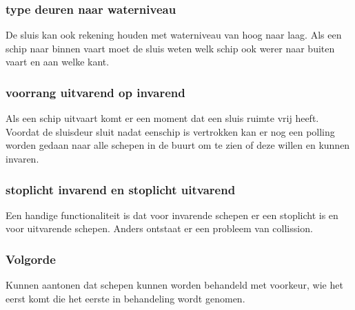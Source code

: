 \subsubsection{type deuren naar waterniveau}
De sluis kan ook rekening houden met waterniveau van hoog naar laag.
Als een schip naar binnen vaart moet de sluis weten welk schip ook werer naar buiten vaart en aan welke kant.

\subsubsection{voorrang uitvarend op invarend}
Als een schip uitvaart komt er een moment dat een sluis ruimte vrij heeft. Voordat de sluisdeur sluit nadat eenschip is vertrokken kan er nog een polling worden gedaan naar alle schepen in de buurt om te zien of deze willen en kunnen invaren.

\subsubsection{stoplicht invarend en stoplicht uitvarend}
Een handige functionaliteit is dat voor invarende schepen er een stoplicht is en voor uitvarende schepen. Anders ontstaat er een probleem van collission. 

\subsubsection{Volgorde}
Kunnen aantonen dat schepen kunnen worden behandeld met voorkeur, wie het eerst komt die het eerste in behandeling wordt genomen.

